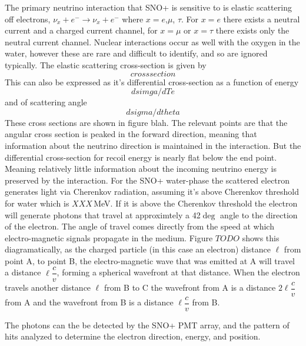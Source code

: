 The primary neutrino interaction that SNO+ is sensitive to is elastic scattering
off electrons,
$\nu_{x} + e^{-} \rightarrow \nu_{x} + e^{-}$
where $x=e$,$\mu$, $\tau$.
For $x=e$ there exists a neutral current and a charged current channel,
for $x=\mu$ or $x=\tau$ there exists only the neutral current channel.
Nuclear interactions occur as well with the oxygen in the water,
however these are rare and difficult to identify, and so are ignored typically.
The elastic scattering cross-section is given by
\begin{equation}
cross section
\end{equation}
This can also be expressed as it's differential cross-section as a function
of energy
\begin{equation}
dsimga/dTe
\end{equation}
and of scattering angle
\begin{equation}
dsigma/dtheta
\end{equation}
These cross sections are shown in figure blah.
The relevant points are that the angular cross section is peaked in
the forward direction, meaning that information about the neutrino direction
is maintained in the interaction.
But the differential cross-section for recoil energy is nearly flat below the
end point. Meaning relatively little information about the incoming neutrino energy
is preserved by the interaction.
For the SNO+ water-phase the scattered electron generates light via Cherenkov radiation,
assuming it's above Cherenkov threshold for water which is $XXX$\,MeV.
If it is above the Cherenkov threshold the electron will generate photons that
travel at approximtely a 42$\deg$ angle to the direction of the electron.
The angle of travel comes directly from the speed at which electro-magnetic
signals propagate in the medium.
Figure $TODO$ shows this diagramatically, as the charged particle (in this case
an electron) distance $\ell$ from point A, to point B, the electro-magnetic wave
that was emitted at A will travel a distance $\ell \dfrac{c}{v}$, forming
a spherical wavefront at that distance.
When the electron travels another distance $\ell$ from B to C the wavefront
from A is a distance $2\ell\dfrac{c}{v}$ from A and the wavefront from B is
a distance $\ell \dfrac{c}{v}$ from B.


The photons can the be detected by the SNO+ PMT array, and the pattern
of hits analyzed to determine the electron direction, energy, and position.

